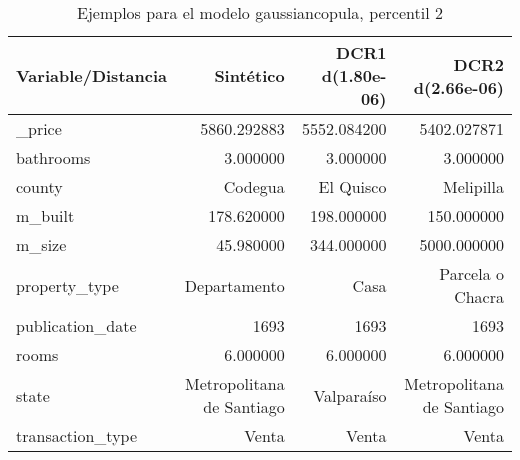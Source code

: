 \begin{table}[H]
\centering
\fontsize{10}{14}\selectfont
\caption{Ejemplos para el modelo gaussiancopula, percentil 2}
\label{table-example-economicos-a-2-gaussiancopula-2p}
\begin{tabular}{|l|r|r|r|}
\hline
\rowcolor[gray]{0.8}
Variable/Distancia & Sintético & DCR1 d(1.80e-06) & DCR2 d(2.66e-06) \\
\hline \_price & \cellcolor[rgb]{0.9, 0.54, 0.52} 5860.292883 & 5552.084200 & 5402.027871 \\
\hline bathrooms & \cellcolor[rgb]{0.9, 0.54, 0.52} 3.000000 & \cellcolor[rgb]{0.9, 0.54, 0.52} 3.000000 & \cellcolor[rgb]{0.9, 0.54, 0.52} 3.000000 \\
\hline county & \cellcolor[rgb]{0.9, 0.54, 0.52} Codegua & El Quisco & Melipilla \\
\hline m\_built & \cellcolor[rgb]{0.9, 0.54, 0.52} 178.620000 & 198.000000 & 150.000000 \\
\hline m\_size & \cellcolor[rgb]{0.9, 0.54, 0.52} 45.980000 & 344.000000 & 5000.000000 \\
\hline property\_type & \cellcolor[rgb]{0.9, 0.54, 0.52} Departamento & Casa & Parcela o Chacra \\
\hline publication\_date & \cellcolor[rgb]{0.9, 0.54, 0.52} 1693 & \cellcolor[rgb]{0.9, 0.54, 0.52} 1693 & \cellcolor[rgb]{0.9, 0.54, 0.52} 1693 \\
\hline rooms & \cellcolor[rgb]{0.9, 0.54, 0.52} 6.000000 & \cellcolor[rgb]{0.9, 0.54, 0.52} 6.000000 & \cellcolor[rgb]{0.9, 0.54, 0.52} 6.000000 \\
\hline state & \cellcolor[rgb]{0.9, 0.54, 0.52} Metropolitana de Santiago & Valparaíso & \cellcolor[rgb]{0.9, 0.54, 0.52} Metropolitana de Santiago \\
\hline transaction\_type & \cellcolor[rgb]{0.9, 0.54, 0.52} Venta & \cellcolor[rgb]{0.9, 0.54, 0.52} Venta & \cellcolor[rgb]{0.9, 0.54, 0.52} Venta \\
\hline
\end{tabular}
\end{table}
